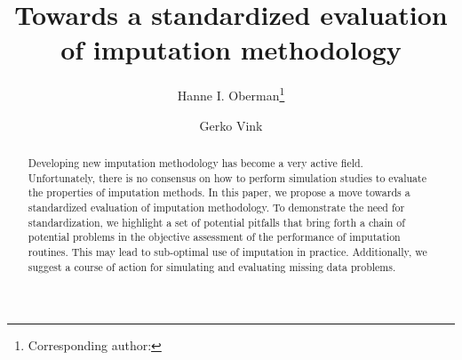 \documentclass[bimj,fleqn]{w-art}
\begin{document}
\keywords{Evaluation; Imputation; Missing data; Simulation studies;\\ [1pc]
\noindent \hspace*{-4pc} Supporting Information for this article is available from \underline{www.gerkovink.com/evaluation}.\\
}  %

\title[Towards a standardized evaluation of imputation methodology]{Towards a standardized evaluation of imputation methodology}
\author[Oberman]{Hanne I. Oberman\footnote{Corresponding author: {}}} 
\address[\inst{1}]{Departement of Methodology \& Statistics, Padualaan 14, 3584 CH Utrecht, The Netherlands}
\author[Vink]{Gerko Vink}
   

\begin{abstract}
Developing new imputation methodology has become a very active field. Unfortunately, there is no consensus on how to perform simulation studies to evaluate the properties of imputation methods. In this paper, we propose a move towards a standardized evaluation of imputation methodology. To demonstrate the need for standardization, we highlight a set of potential pitfalls that bring forth a chain of potential problems in the objective assessment of the performance of imputation routines. This may lead to sub-optimal use of  imputation in practice. Additionally, we suggest a course of action for simulating and evaluating missing data problems.
\end{abstract}



\maketitle          %
\end{document}

